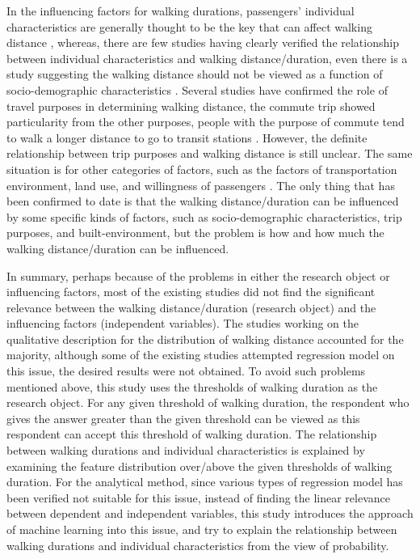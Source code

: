 \documentclass[Journal,letterpaper]{ascelike-new}
\begin{document}
%
In the influencing factors for walking durations, passengers' individual characteristics are generally thought to be the key that can affect walking distance \cite{Besser2005,WeinsteinAgrawal2008,Krygsman2004,Yang2012,Daniels2013,Guerra2012}, whereas, there are few studies having clearly verified the relationship between individual characteristics and walking distance/duration, even there is a study suggesting the walking distance should not be viewed as a function of socio-demographic characteristics \cite{Krygsman2004}. Several studies have confirmed the role of travel purposes in determining walking distance, the commute trip showed particularity from the other purposes, people with the purpose of commute tend to walk a longer distance to go to transit stations \cite{Larsen2010}. However, the definite relationship between trip purposes and walking distance is still unclear. The same situation is for other categories of factors, such as the factors of transportation environment, land use, and willingness of passengers \cite{Guerra2012,Krygsman2004,WeinsteinAgrawal2008}. The only thing that has been confirmed to date is that the walking distance/duration can be influenced by some specific kinds of factors, such as socio-demographic characteristics, trip purposes, and built-environment, but the problem is how and how much the walking distance/duration can be influenced.

%
In summary, perhaps because of the problems in either the research object or influencing factors, most of the existing studies did not find the significant relevance between the walking distance/duration (research object) and the influencing factors (independent variables). The studies working on the qualitative description for the distribution of walking distance accounted for the majority, although some of the existing studies attempted regression model on this issue, the desired results were not obtained. To avoid such problems mentioned above, this study uses the thresholds of walking duration as the research object. For any given threshold of walking duration, the respondent who gives the answer greater than the given threshold can be viewed as this respondent can accept this threshold of walking duration. The relationship between walking durations and individual characteristics is explained by examining the feature distribution over/above the given thresholds of walking duration. For the analytical method, since various types of regression model has been verified not suitable for this issue, instead of finding the linear relevance between dependent and independent variables, this study introduces the approach of machine learning into this issue, and try to explain the relationship between walking durations and individual characteristics from the view of probability.
\end{document}
